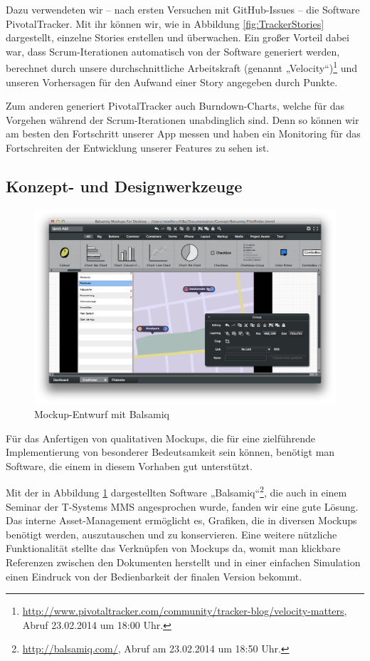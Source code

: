 	Dazu verwendeten wir – nach ersten Versuchen mit GitHub-Issues – die Software PivotalTracker. Mit ihr können wir, wie in Abbildung \ref{fig:TrackerStories} dargestellt, einzelne Stories erstellen und überwachen. Ein großer Vorteil dabei war, dass Scrum-Iterationen automatisch von der Software generiert werden, berechnet durch unsere durchschnittliche Arbeitskraft (genannt „Velocity“)\footnote{\url{http://www.pivotaltracker.com/community/tracker-blog/velocity-matters}, Abruf 23.02.2014 um 18:00 Uhr.} und unseren Vorhersagen für den Aufwand einer Story angegeben durch Punkte.

	Zum anderen generiert PivotalTracker auch Burndown-Charts, welche für das Vorgehen während der Scrum-Iterationen unabdinglich sind. Denn so können wir am besten den Fortschritt unserer App messen und haben ein Monitoring für das Fortschreiten der Entwicklung unserer Features zu sehen ist.

\subsection{Konzept- und Designwerkzeuge}
\begin{figure}[hb]
	\centering
	\includegraphics[scale=.3]{Pictures/BalsamiqEntwurf}
	\vspace{-.8cm}
	\caption{Mockup-Entwurf mit Balsamiq\label{fig:BalsamiqEntwurf}}
\end{figure}
	
	Für das Anfertigen von qualitativen Mockups, die für eine zielführende Implementierung von besonderer Bedeutsamkeit sein können, benötigt man Software, die einem in diesem Vorhaben gut unterstützt.
	
	Mit der in Abbildung \ref{fig:BalsamiqEntwurf} dargestellten Software „Balsamiq“\footnote{\url{http://balsamiq.com/}, Abruf am 23.02.2014 um 18:50 Uhr.}, die auch in einem Seminar der T-Systems MMS angesprochen wurde, fanden wir eine gute Lösung. Das interne Asset-Management ermöglicht es, Grafiken, die in diversen Mockups benötigt werden, auszutauschen und zu konservieren. Eine weitere nützliche Funktionalität stellte das Verknüpfen von Mockups da, womit man klickbare Referenzen zwischen den Dokumenten herstellt und in einer einfachen Simulation einen Eindruck von der Bedienbarkeit der finalen Version bekommt.


